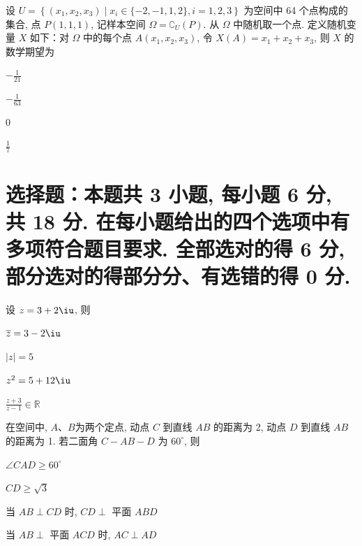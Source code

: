 \documentclass{exam-zh}
\begin{document}
\begin{question}%
  设 $U=\left\{\left(x_{1},x_{2},x_{3}\right) \mid x_{i}
  \in\{-2,-1,1,2\}, i=1,2,3\right\}$
  为空间中 64 个点构成的集合, 点 $P(1,1,1)$, 记样本空间 $\Omega=\complement_{U}(P)
  $. 从 $\Omega$ 中随机取一个点.
  定义随机变量 $X$ 如下：对 $\Omega$ 中的每个点 $A\left(x_{1},x_{2},x_{3}\right)$,
  令 $X(A)=x_{1}+x_{2}+x_{3}$, 则 $X$ 的数学期望为 \paren
  \begin{choices}
  \item $-\frac{1}{21}$
  \item $-\frac{1}{63}$
  \item $0$
  \item $\frac{1}{7}$
  \end{choices}
\end{question}

\section{选择题：本题共 3 小题, 每小题 6 分, 共 18 分.
  在每小题给出的四个选项中有多项符合题目要求. 全部选对的得 6 分,
部分选对的得部分分、有选错的得 0 分.}

\begin{question}%
  设 $z=3+2\iu$, 则 \paren
  \begin{choices}
  \item $\overline{z}=3-2\iu$
  \item $|z|=5$
  \item $z^{2}=5+12\iu$
  \item $\frac{z+3}{z-1}\in\mathbb{R}$
  \end{choices}
\end{question}

\begin{question}%
  在空间中, $A$、$B$为两个定点, 动点 $C$ 到直线 $AB$ 的距离为 2, 动点 $D$ 到直线 $AB$ 的距离为 1.
  若二面角 $C-AB-D$ 为 $60^{\circ}$, 则 \paren
  \begin{choices}
  \item $\angle CAD\geqslant60^{\circ}$
  \item $CD\geqslant\sqrt{3}$
  \item 当 $AB\perp CD$ 时, $CD\perp$ 平面 $ABD$
  \item 当 $AB\perp$ 平面 $ACD$ 时, $AC\perp AD$
  \end{choices}
\end{question}
\end{document}
